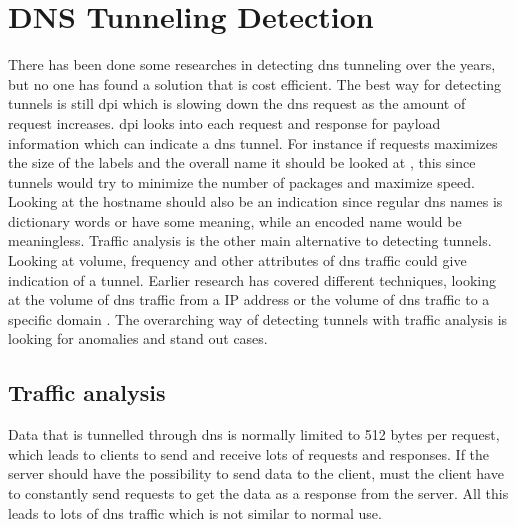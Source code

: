 \chapter{DNS Tunneling Detection}
\label{chp:dns_detection}

There has been done some researches in detecting \Gls{dns} tunneling over the years, but no one has found a solution that is cost efficient. The best way for detecting tunnels is still \Gls{dpi} which is slowing down the \Gls{dns} request as the amount of request increases. \Gls{dpi} looks into each request and response for payload information which can indicate a \Gls{dns} tunnel. For instance if requests maximizes the size of the labels and the overall name it should be looked at \cite{farnham2013detecting}, this since tunnels would try to minimize the number of packages and maximize speed. Looking at the hostname should also be an indication since regular \Gls{dns} names is dictionary words or have some meaning, while an encoded name would be meaningless. Traffic analysis is the other main alternative to detecting tunnels. Looking at volume, frequency and other attributes of \Gls{dns} traffic could give indication of a tunnel. Earlier research has covered different techniques, looking at the volume of \Gls{dns} traffic from a IP address or the volume of \Gls{dns} traffic to a specific domain \cite{farnham2013detecting}. The overarching way of detecting tunnels with traffic analysis is looking for anomalies and stand out cases.

\section{Traffic analysis}
Data that is tunnelled through \Gls{dns} is normally limited to 512 bytes per request, which leads to clients to send and receive lots of requests and responses. If the server should have the possibility to send data to the client, must the client have to constantly send requests to get the data as a response from the server. All this leads to lots of \Gls{dns} traffic which is not similar to normal use.
